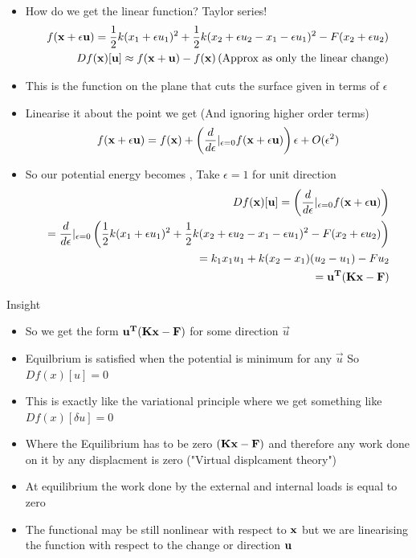 	\begin{frame}
		\begin{itemize}
			\item How do we get the linear function? Taylor series!
			\begin{align*}
			f(\mathbf{x+\epsilon u}) = \frac{1}{2}k(x_1+\epsilon u_1)^2 + \frac{1}{2}k(x_2 + \epsilon u_2-x_1-\epsilon u_1)^2 - F(x_2 + \epsilon u_2) \\ 
			Df(\mathbf{x})[\mathbf{u}] \approx f(\mathbf{x+u}) - f(\mathbf{x}) \left(\text{Approx as only the linear change} \right)			
			\end{align*}
			\item This is the function on the plane that cuts the surface given in terms of $\epsilon$
			\item Linearise it about the point we get (And ignoring higher order terms)
			\begin{align*}
				f(\mathbf{x+\epsilon u}) = f(\mathbf{x}) + \left(\frac{ d}{ d\epsilon}|_{\epsilon = 0} f(\mathbf{x+\epsilon u}) \right) \epsilon + O(\epsilon^2)
			\end{align*}
			\item So our potential energy becomes , Take $\epsilon =1$ for unit direction
			\begin{align*}
			Df(\mathbf{x})[\mathbf{u}] = \left(\frac{ d}{ d\epsilon}|_{\epsilon = 0} f(\mathbf{x+\epsilon u}) \right) \\
			= \frac{ d}{ d\epsilon}|_{\epsilon = 0}\left(  \frac{1}{2}k(x_1+\epsilon u_1)^2 + \frac{1}{2}k(x_2 + \epsilon u_2-x_1-\epsilon u_1)^2 - F(x_2 + \epsilon u_2) \right) \\
			=k_1x_1u_1 + k(x_2-x_1)(u_2-u_1) - Fu_2 \\
			= \mathbf{u^T(Kx-F)}
			\end{align*}
		\end{itemize}
	\end{frame}

	\begin{frame}{Insight}
		\begin{itemize}
			\item So we get the form $\mathbf{u^T(Kx-F)}$ for some direction $\vec{u}$
			\item Equilbrium is satisfied when the potential is minimum for any $\vec{u}$ So $Df(x)[u] =0$
			\item This is exactly like the variational principle where we get something like $Df(x)[\delta u] =0$
			\item Where the Equilibrium has to be zero  $\mathbf{(Kx-F)}$ and therefore any work done on it by any displacment is zero ("Virtual displcament theory")
			\item At equilibrium the work done by the external and internal loads is equal to zero
			\item The functional may be still nonlinear with respect to $\mathbf{x}$ but we are linearising the function with respect to the change or direction $\mathbf{u}$ 
		\end{itemize}
	\end{frame}


